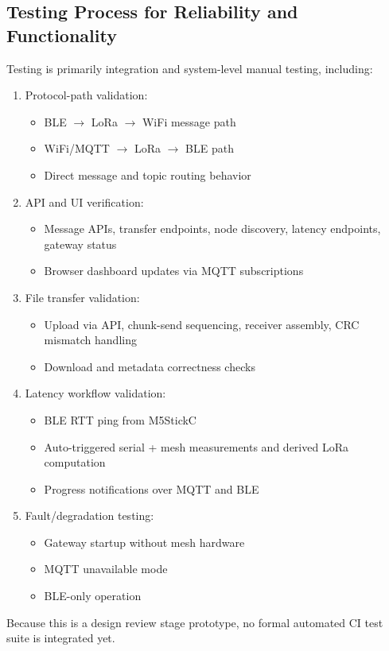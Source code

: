 \documentclass[conference]{IEEEtran}
\begin{document}
\subsection{Testing Process for Reliability and Functionality}
Testing is primarily integration and system-level manual testing, including:
\begin{enumerate}
\item Protocol-path validation:
\begin{itemize}
\item BLE $\rightarrow$ LoRa $\rightarrow$ WiFi message path
\item WiFi/MQTT $\rightarrow$ LoRa $\rightarrow$ BLE path
\item Direct message and topic routing behavior
\end{itemize}
\item API and UI verification:
\begin{itemize}
\item Message APIs, transfer endpoints, node discovery, latency endpoints, gateway status
\item Browser dashboard updates via MQTT subscriptions
\end{itemize}
\item File transfer validation:
\begin{itemize}
\item Upload via API, chunk-send sequencing, receiver assembly, CRC mismatch handling
\item Download and metadata correctness checks
\end{itemize}
\item Latency workflow validation:
\begin{itemize}
\item BLE RTT ping from M5StickC
\item Auto-triggered serial + mesh measurements and derived LoRa computation
\item Progress notifications over MQTT and BLE
\end{itemize}
\item Fault/degradation testing:
\begin{itemize}
\item Gateway startup without mesh hardware
\item MQTT unavailable mode
\item BLE-only operation
\end{itemize}
\end{enumerate}

Because this is a design review stage prototype, no formal automated CI test suite is integrated yet.
\end{document}
